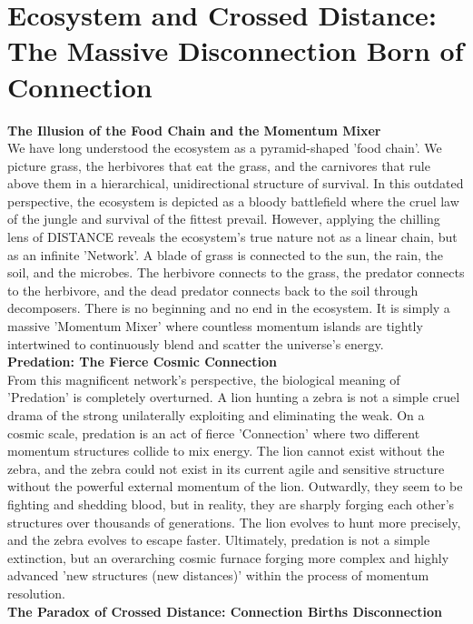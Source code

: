 

\section{Ecosystem and Crossed Distance: The Massive Disconnection Born of Connection}
\textbf{The Illusion of the Food Chain and the Momentum Mixer} \\
We have long understood the ecosystem as a pyramid-shaped 'food chain'. We picture grass, the herbivores that eat the grass, and the carnivores that rule above them in a hierarchical, unidirectional structure of survival. In this outdated perspective, the ecosystem is depicted as a bloody battlefield where the cruel law of the jungle and survival of the fittest prevail.
However, applying the chilling lens of DISTANCE reveals the ecosystem's true nature not as a linear chain, but as an infinite 'Network'. A blade of grass is connected to the sun, the rain, the soil, and the microbes. The herbivore connects to the grass, the predator connects to the herbivore, and the dead predator connects back to the soil through decomposers. There is no beginning and no end in the ecosystem. It is simply a massive 'Momentum Mixer' where countless momentum islands are tightly intertwined to continuously blend and scatter the universe's energy. \\
\textbf{Predation: The Fierce Cosmic Connection} \\
From this magnificent network's perspective, the biological meaning of 'Predation' is completely overturned. A lion hunting a zebra is not a simple cruel drama of the strong unilaterally exploiting and eliminating the weak. On a cosmic scale, predation is an act of fierce 'Connection' where two different momentum structures collide to mix energy.
The lion cannot exist without the zebra, and the zebra could not exist in its current agile and sensitive structure without the powerful external momentum of the lion. Outwardly, they seem to be fighting and shedding blood, but in reality, they are sharply forging each other's structures over thousands of generations. The lion evolves to hunt more precisely, and the zebra evolves to escape faster. Ultimately, predation is not a simple extinction, but an overarching cosmic furnace forging more complex and highly advanced 'new structures (new distances)' within the process of momentum resolution. \\
\textbf{The Paradox of Crossed Distance: Connection Births Disconnection} \\
